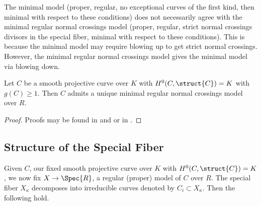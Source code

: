 \begin{remark}
The minimal model (proper, regular, no exceptional curves of the first kind, then minimal with respect to these conditions) does not necessarily agree with the minimal regular normal crossings model (proper, regular, strict normal  crossings divisors in the special fiber, minimal with respect to these conditions). This is because the minimal model may require blowing up to get strict normal crossings. However, the minimal regular normal crossings model gives the minimal model via blowing down. 
\end{remark}

\begin{theorem}
Let $C$ be a smooth projective curve over $K$ with $H^0(C, \struct{C}) = K$ with $g(C) \ge 1$. Then $C$ admits a unique minimal regular normal crossings model over $R$.
\end{theorem}

\begin{proof}
Proofs may be found in \cite[Sec. 9, Cor. 2.30]{liu} and \cite[Sec. 9, Thm. 3.36]{liu} or in \cite[Thm. 2.5.2]{romagny_models}.
\end{proof}

\subsection{Structure of the Special Fiber}

Given $C$, our fixed smooth projective curve over $K$ with $H^0(C, \struct{C}) = K$, we now fix $X \to \Spec{R}$, a regular (proper) model of $C$ over $R$. The special fiber $X_\kappa$ decomposes into irreducible curves denoted by $C_i \subset X_\kappa$. Then the following hold.

